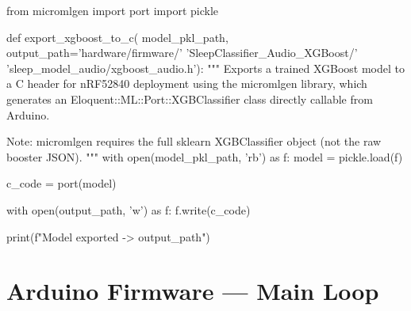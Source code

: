 \begin{pycode}
from micromlgen import port
import pickle

def export_xgboost_to_c(
        model_pkl_path,
        output_path='hardware/firmware/'
                    'SleepClassifier_Audio_XGBoost/'
                    'sleep_model_audio/xgboost_audio.h'):
    """
    Exports a trained XGBoost model to a C header for nRF52840 deployment
    using the micromlgen library, which generates an
    Eloquent::ML::Port::XGBClassifier class directly callable from Arduino.

    Note: micromlgen requires the full sklearn XGBClassifier object
    (not the raw booster JSON).
    """
    with open(model_pkl_path, 'rb') as f:
        model = pickle.load(f)

    c_code = port(model)

    with open(output_path, 'w') as f:
        f.write(c_code)

    print(f"Model exported -> {output_path}")
\end{pycode}


\section{Arduino Firmware --- Main Loop}
\label{app:firmware}

